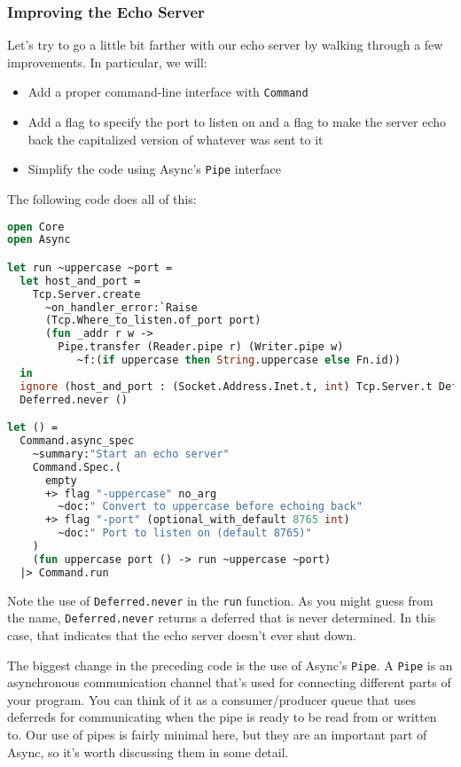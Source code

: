 \hypertarget{improving-the-echo-server}{%
\subsubsection{Improving the Echo
Server}\label{improving-the-echo-server}}

Let's try to go a little bit farther with our echo server by walking
through a few improvements. In particular, we will:

\begin{itemize}
\item
  Add a proper command-line interface with
  \passthrough{\lstinline!Command!}
\item
  Add a flag to specify the port to listen on and a flag to make the
  server echo back the capitalized version of whatever was sent to it
\item
  Simplify the code using Async's \passthrough{\lstinline!Pipe!}
  interface
\end{itemize}

The following code does all of this:

\begin{lstlisting}[language=Caml]
open Core
open Async

let run ~uppercase ~port =
  let host_and_port =
    Tcp.Server.create
      ~on_handler_error:`Raise
      (Tcp.Where_to_listen.of_port port)
      (fun _addr r w ->
        Pipe.transfer (Reader.pipe r) (Writer.pipe w)
           ~f:(if uppercase then String.uppercase else Fn.id))
  in
  ignore (host_and_port : (Socket.Address.Inet.t, int) Tcp.Server.t Deferred.t);
  Deferred.never ()

let () =
  Command.async_spec
    ~summary:"Start an echo server"
    Command.Spec.(
      empty
      +> flag "-uppercase" no_arg
        ~doc:" Convert to uppercase before echoing back"
      +> flag "-port" (optional_with_default 8765 int)
        ~doc:" Port to listen on (default 8765)"
    )
    (fun uppercase port () -> run ~uppercase ~port)
  |> Command.run
\end{lstlisting}

Note the use of \passthrough{\lstinline!Deferred.never!} in the
\passthrough{\lstinline!run!} function. As you might guess from the
name, \passthrough{\lstinline!Deferred.never!} returns a deferred that
is never determined. In this case, that indicates that the echo server
doesn't ever shut down. 

The biggest change in the preceding code is the use of Async's
\passthrough{\lstinline!Pipe!}. A \passthrough{\lstinline!Pipe!} is an
asynchronous communication channel that's used for connecting different
parts of your program. You can think of it as a consumer/producer queue
that uses deferreds for communicating when the pipe is ready to be read
from or written to. Our use of pipes is fairly minimal here, but they
are an important part of Async, so it's worth discussing them in some
detail. 

